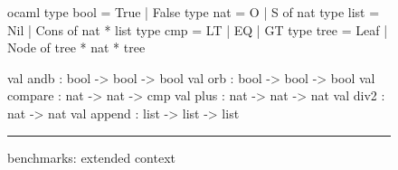 \begin{figure}
  \begin{center}
    \begin{cminted}{ocaml}
type bool = True | False
type nat = O | S of nat
type list = Nil | Cons of nat * list
type cmp = LT | EQ | GT
type tree = Leaf | Node of tree * nat * tree

val andb : bool -> bool -> bool
val orb : bool -> bool -> bool
val compare : nat -> nat -> cmp
val plus : nat -> nat ->  nat
val div2 : nat -> nat
val append : list -> list -> list
    \end{cminted}
  \end{center}

  \hrule
  \caption{\myth{} benchmarks: extended context}
  \label{fig:myth-extended-context}
\end{figure}

